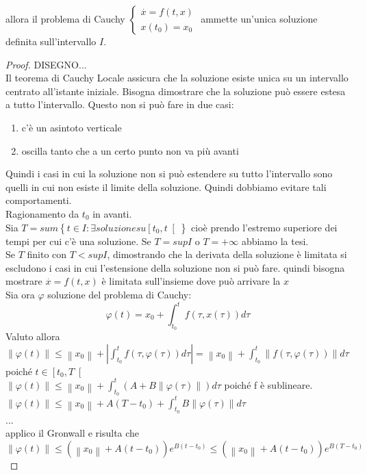 allora il problema di Cauchy $\left\{\begin{matrix}\overset{\cdot}{x}=f(t,x)\\x(t_0)=x_0\end{matrix}\right.$ ammette un'unica soluzione definita sull'intervallo $I$.
\begin{proof}
	DISEGNO...\\
	Il teorema di Cauchy Locale assicura che  la soluzione esiste unica su un intervallo centrato all'istante iniziale.
	Bisogna dimostrare che la soluzione può essere estesa a tutto l'intervallo. Questo non si può fare in due casi:
	\begin{enumerate}
		\item c'è un asintoto verticale
		\item oscilla tanto che a un certo punto non va più avanti
	\end{enumerate}
	Quindi i casi in cui la soluzione non si può estendere su tutto l'intervallo sono quelli in cui non esiste il limite della soluzione. Quindi dobbiamo evitare tali comportamenti.\\
	Ragionamento da $t_0$ in avanti.\\
	Sia $T=sum\left\{t\in I :\exists soluzione su \left[ t_0,t \right[ \right\}$ cioè prendo l'estremo superiore dei tempi per cui c'è una soluzione.
	Se $T= sup I$ o $T=+\infty$ abbiamo la tesi.\\
	Se $T$ finito con $T<sup I$, dimostrando che la derivata della soluzione è limitata si escludono i casi in cui l'estensione della soluzione non si può fare.
	quindi bisogna mostrare $\overset{\cdot}{x} = f(t,x)$ è limitata sull'insieme dove può arrivare la $x$\\
	Sia ora $\varphi$ soluzione del problema di Cauchy:
	$$ \varphi(t) = x_0 + \int_{t_0}^tf(\tau,x(\tau))d\tau$$
	Valuto allora\\
	$\left\|\varphi(t)\right\|\le \left\|x_0\right\| + \left|\int_{t_0}^tf(\tau,\varphi(\tau))d\tau\right|=\left\|x_0\right\| + \int_{t_0}^t\left\|f(\tau,\varphi(\tau))\right\|d\tau$ poiché $t\in\left[t_0,T\right[$\\
	$\left\|\varphi(t)\right\|\le \left\|x_0\right\| + \int_{t_0}^t\left(A+B\left\|\varphi(\tau)\right\|\right)d\tau$ poiché f è sublineare.\\
	$\left\|\varphi(t)\right\|\le \left\|x_0\right\| + A(T-t_0)+\int_{t_0}^t B\left\|\varphi(\tau)\right\|d\tau$\\
	...\\
	applico il Gronwall e risulta che
	$$\left\|\varphi(t)\right\|\le\left(\left\|x_0\right\|+A(t-t_0)\right)e^{B(t-t_0)}\le\left(\left\|x_0\right\|+A(t-t_0)\right)e^{B(T-t_0)}$$	

\end{proof}
